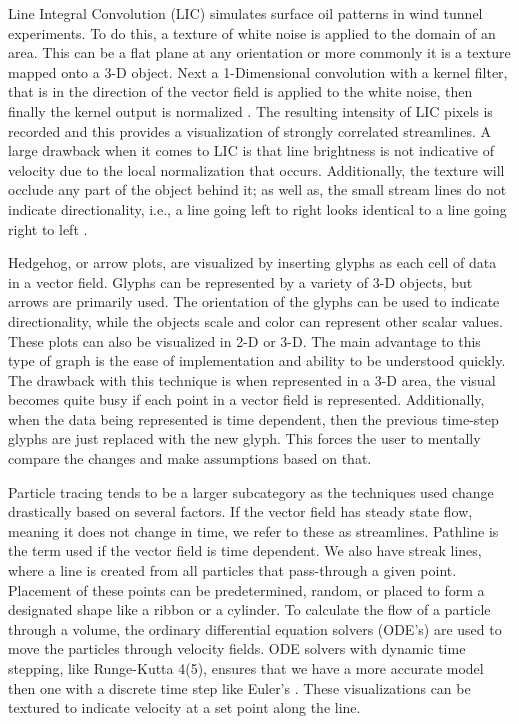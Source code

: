 Line Integral Convolution (LIC) simulates surface oil patterns in wind tunnel experiments. To do this, a texture of white noise is applied to the domain of an area. This can be a flat plane at any orientation or more commonly it is a texture mapped onto a 3-D object. Next a 1-Dimensional convolution with a kernel filter, that is in the direction of the vector field is applied to the white noise, then finally the kernel output is normalized \cite{Cabral1993}. The resulting intensity of LIC pixels is recorded and this provides a visualization of strongly correlated streamlines. A large drawback when it comes to LIC is that line brightness is not indicative of velocity due to the local normalization that occurs. Additionally, the texture will occlude any part of the object behind it; as well as, the small stream lines do not indicate directionality, i.e., a line going left to right looks identical to a line going right to left \cite{LIC}. \par

Hedgehog, or arrow plots, are visualized by inserting glyphs as each cell of data in a vector field. Glyphs can be represented by a variety of 3-D objects, but arrows are primarily used. The orientation of the glyphs can be used to indicate directionality, while the objects scale and color can represent other scalar values. These plots can also be visualized in 2-D or 3-D. The main advantage to this type of graph is the ease of implementation and ability to be understood quickly. The drawback with this technique is when represented in a 3-D area, the visual becomes quite busy if each point in a vector field is represented. Additionally, when the data being represented is time dependent, then the previous time-step glyphs are just replaced with the new glyph. This forces the user to mentally compare the changes and make assumptions based on that. \par

Particle tracing tends to be a larger subcategory as the techniques used change drastically based on several factors. If the vector field has steady state flow, meaning it does not change in time, we refer to these as streamlines. Pathline is the term used if the vector field is time dependent. We also have streak lines, where a line is created from all particles that pass-through a given point. Placement of these points can be predetermined, random, or placed to form a designated shape like a ribbon or a cylinder. To calculate the flow of a particle through a volume, the ordinary differential equation solvers (ODE’s) are used to move the particles through velocity fields. ODE solvers with dynamic time stepping, like Runge-Kutta 4(5), ensures that we have a more accurate model then one with a discrete time step like Euler’s \cite{Teitzel1997}. These visualizations can be textured to indicate velocity at a set point along the line.

